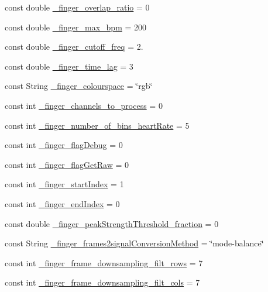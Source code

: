 \begin{DoxyCompactItemize}
\item 
const double \hyperlink{namespace_m_h_r_a6ab2b5eaa5246621b9039b65e5501f1c}{\+\_\+finger\+\_\+overlap\+\_\+ratio} = 0
\item 
const double \hyperlink{namespace_m_h_r_ae15a1148a0dba9f30071db8315b9fe88}{\+\_\+finger\+\_\+max\+\_\+bpm} = 200
\item 
const double \hyperlink{namespace_m_h_r_a6125713b446a1bdd5bbc0fb9e75fc58e}{\+\_\+finger\+\_\+cutoff\+\_\+freq} = 2.
\item 
const double \hyperlink{namespace_m_h_r_ae2523999aef7718ac3e6edeb318edf8a}{\+\_\+finger\+\_\+time\+\_\+lag} = 3
\item 
const String \hyperlink{namespace_m_h_r_af6ec9103edc4e3fe7011676f91c83c26}{\+\_\+finger\+\_\+colourspace} = \char`\"{}rgb\char`\"{}
\item 
const int \hyperlink{namespace_m_h_r_a16934905e88de3a2d084e6734948ec65}{\+\_\+finger\+\_\+channels\+\_\+to\+\_\+process} = 0
\item 
const int \hyperlink{namespace_m_h_r_a2762706b15a5accb61b7efa79cd0617a}{\+\_\+finger\+\_\+number\+\_\+of\+\_\+bins\+\_\+heart\+Rate} = 5
\item 
const int \hyperlink{namespace_m_h_r_aefc7157a4757a4b9017c968a17fb8ee1}{\+\_\+finger\+\_\+flag\+Debug} = 0
\item 
const int \hyperlink{namespace_m_h_r_a24fb7c804c7833388056a5e417354257}{\+\_\+finger\+\_\+flag\+Get\+Raw} = 0
\item 
const int \hyperlink{namespace_m_h_r_a25e5a8e8b0d72f6cfa98fa75e943f35e}{\+\_\+finger\+\_\+start\+Index} = 1
\item 
const int \hyperlink{namespace_m_h_r_a8b1ee45fde805239e5267fb0dcb03735}{\+\_\+finger\+\_\+end\+Index} = 0
\item 
const double \hyperlink{namespace_m_h_r_a417e8c2df65251a5a34b250f975a3867}{\+\_\+finger\+\_\+peak\+Strength\+Threshold\+\_\+fraction} = 0
\item 
const String \hyperlink{namespace_m_h_r_a4c571f87fe52934440add1a3a5a98e14}{\+\_\+finger\+\_\+frames2signal\+Conversion\+Method} = \char`\"{}mode-\/balance\char`\"{}
\item 
const int \hyperlink{namespace_m_h_r_a5d49af784fd77df019705d26d3654953}{\+\_\+finger\+\_\+frame\+\_\+downsampling\+\_\+filt\+\_\+rows} = 7
\item 
const int \hyperlink{namespace_m_h_r_a2c854934355cedc3760bfddd3bcd03a6}{\+\_\+finger\+\_\+frame\+\_\+downsampling\+\_\+filt\+\_\+cols} = 7
\item 

\end{DoxyCompactItemize}
